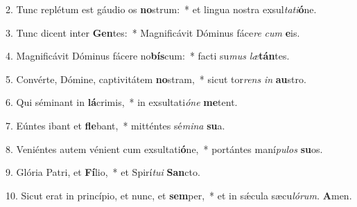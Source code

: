 \item 2. Tunc replétum est gáudio os \textbf{no}strum:~* et lingua nostra exsul\textit{tati}\textbf{ó}ne.
\item 3. Tunc dicent inter \textbf{Gen}tes:~* Magnificávit Dóminus fáce\textit{re} \textit{cum} \textbf{e}is.
\item 4. Magnificávit Dóminus fácere no\textbf{bís}cum:~* facti su\textit{mus} \textit{læ}\textbf{tán}tes.
\item 5. Convérte, Dómine, ca\-ptivitátem \textbf{no}stram,~* sicut tor\textit{rens} \textit{in} \textbf{au}stro.
\item 6. Qui séminant in \textbf{lá}crimis,~* in exsultati\textit{óne} \textbf{me}tent.
\item 7. Eúntes ibant et \textbf{fle}bant,~* mitténtes sé\textit{mina} \textbf{su}a.
\item 8. Veniéntes autem vénient cum exsultati\textbf{ó}ne,~* portántes maní\textit{pulos} \textbf{su}os.
\item 9. Glória Patri, et \textbf{Fí}lio,~* et Spirí\textit{tui} \textbf{San}cto.
\item 10. Sicut erat in princípio, et nunc, et \textbf{sem}per,~* et in sǽcula sæcu\tinyhspace\textit{lórum.} \textbf{A}men.